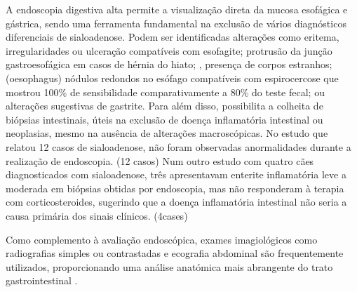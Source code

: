A endoscopia digestiva alta permite a visualização direta da mucosa esofágica e gástrica, sendo uma ferramenta fundamental na exclusão de vários diagnósticos diferenciais de sialoadenose. \cite{lhermette_bsava_2021} Podem ser identificadas alterações como eritema, irregularidades ou ulceração compatíveis com esofagite;\cite{lhermette_bsava_2021} protrusão da junção gastroesofágica em casos de hérnia do hiato; \cite{Kim2021},\cite{Broux2018} presença de corpos estranhos;(oesophagus) nódulos redondos no esófago compatíveis com espirocercose que mostrou 100\% de sensibilidade comparativamente a 80\% do teste fecal;\cite{vanderMerwe2008,mylonakis_canine_2008} ou alterações sugestivas de gastrite. Para além disso, possibilita a colheita de biópsias intestinais, úteis na exclusão de doença inflamatória intestinal ou neoplasias, mesmo na ausência de alterações macroscópicas. \cite{Cerquetella2010} No estudo que relatou 12 casos de sialoadenose, não foram observadas anormalidades durante a realização de endoscopia. (12 casos) Num outro estudo com quatro cães diagnosticados com sialoadenose, três apresentavam enterite inflamatória leve a moderada em biópsias obtidas por endoscopia, mas não responderam à terapia com corticosteroides, sugerindo que a doença inflamatória intestinal não seria a causa primária dos sinais clínicos. (4cases)


Como complemento à avaliação endoscópica, exames imagiológicos como radiografias simples ou contrastadas e ecografia abdominal são frequentemente utilizados, proporcionando uma análise anatómica mais abrangente do trato gastrointestinal \cite{mccarthy_veterinary_2021}.


